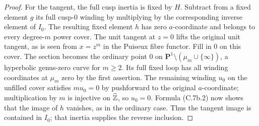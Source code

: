 \begin{proof}
For the tangent, the full cusp inertia is fixed by $H$. Subtract from a
fixed element $g$ its full cusp-$0$ winding by multiplying by the
corresponding inverse element of $I_0$. The resulting fixed element $h$
has zero $a$-coordinate and belongs to every degree-$m$ power cover.
The unit tangent at $z=0$ lifts the original unit tangent, as is seen from
$x=z^m$ in the Puiseux fibre functor. Fill in $0$ on this cover. The
section becomes the ordinary point $0$ on
$\mathbf P^1\setminus(\mu_m\cup\{\infty\})$, a hyperbolic genus-zero
curve for $m\ge2$. Its full fixed loop has all winding coordinates at
$\mu_m$ zero by the first assertion. The remaining winding $u_0$ on the
unfilled cover satisfies $m u_0=0$ by pushforward to the original
$a$-coordinate; multiplication by $m$ is injective on $\widehat{\mathbb Z}$,
so $u_0=0$. Formula (C.7b.2) now shows that the image of $h$ vanishes,
as in the ordinary case. Thus the tangent image is contained in $I_0$;
that inertia supplies the reverse inclusion.
\end{proof}
